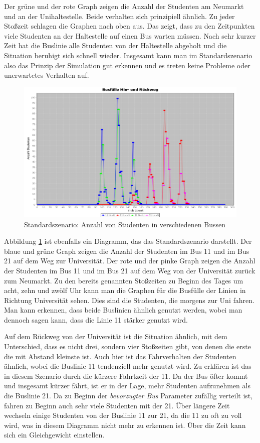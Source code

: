 \documentclass[12pt,a4paper]{scrartcl}
\begin{document}
Der grüne und der rote Graph zeigen die Anzahl der Studenten am Neumarkt und an der Unihaltestelle. Beide verhalten sich prinzipiell ähnlich. Zu jeder Stoßzeit schlagen die Graphen nach oben aus. Das zeigt, dass zu den Zeitpunkten viele Studenten an der Haltestelle auf einen Bus warten müssen. Nach sehr kurzer Zeit hat die Buslinie alle Studenten von der Haltestelle abgeholt und die Situation beruhigt sich schnell wieder.
Insgesamt kann man im Standardszenario also das Prinzip der Simulation gut erkennen und es treten keine Probleme oder unerwartetes Verhalten auf.

\begin{figure}
\includegraphics[scale=0.4]{Standardszenario_Busse.png}
\caption{Standardszenario: Anzahl von Studenten in verschiedenen Bussen}
\label{s1g2}
\end{figure}

Abbildung \ref{s1g2} ist ebenfalls ein Diagramm, das das Standardszenario darstellt. Der blaue und grüne Graph zeigen die Anzahl der Studenten im Bus 11 und im Bus 21 auf dem Weg zur Universität. Der rote und der pinke Graph zeigen die Anzahl der Studenten im Bus 11 und im Bus 21 auf dem Weg von der Universität zurück zum Neumarkt. Zu den bereits genannten Stoßzeiten zu Beginn des Tages um acht, zehn und zwölf Uhr kann man die Graphen für die Busfülle der Linien in Richtung Universität sehen. Dies sind die Studenten, die morgens zur Uni fahren. Man kann erkennen, dass beide Buslinien ähnlich genutzt werden, wobei man dennoch sagen kann, dass die Linie 11 stärker genutzt wird. 

Auf dem Rückweg von der Universität ist die Situation ähnlich, mit dem Unterschied, dass es nicht drei, sondern vier Stoßzeiten gibt, von denen die erste die mit Abstand kleinste ist. Auch hier ist das Fahrverhalten der Studenten ähnlich, wobei die Buslinie 11 tendenziell mehr genutzt wird. 
Zu erklären ist das in diesem Szenario durch die kürzere Fahrtzeit der 11. Da der Bus öfter kommt und insgesamt kürzer fährt, ist er in der Lage, mehr Studenten aufzunehmen als die Buslinie 21. Da zu Beginn der \textit{bevorzugter Bus} Parameter zufällig verteilt ist, fahren zu Beginn auch sehr viele Studenten mit der 21. Über längere Zeit wechseln einige Studenten von der Buslinie 11 zur 21, da die 11 zu oft zu voll wird, was in diesem Diagramm nicht mehr zu erkennen ist. Über die Zeit kann sich ein Gleichgewicht einstellen.
\end{document}
